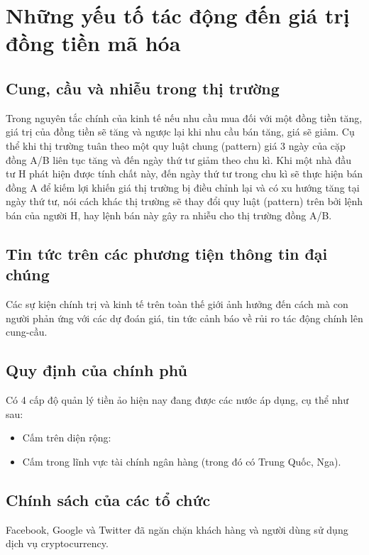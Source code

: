 \section{Những yếu tố tác động đến giá trị đồng tiền mã hóa} \label{overview:factor}
\subsection{Cung, cầu và nhiễu trong thị trường}\label{overview:market-noise}
Trong nguyên tắc chính của kinh tế nếu nhu cầu mua đối với một đồng tiền tăng, giá trị của đồng tiền sẽ tăng và ngược lại khi nhu cầu bán tăng, giá sẽ giảm. Cụ thể khi thị trường tuân theo một quy luật chung (pattern) giá 3 ngày của cặp đồng A/B liên tục tăng và đến ngày thứ tư giảm theo chu kì. Khi một nhà đầu tư H phát hiện được tính chất này, đến ngày thứ tư trong chu kì sẽ thực hiện bán đồng A để kiếm lợi khiến giá thị trường bị điều chỉnh lại và có xu hướng tăng tại ngày thứ tư, nói cách khác thị trường sẽ thay đổi quy luật (pattern) trên bởi lệnh bán của người H, hay lệnh bán này gây ra nhiễu cho thị trường đồng A/B.
\subsection{Tin tức trên các phương tiện thông tin đại chúng}
Các sự kiện chính trị và kinh tế trên toàn thế giới ảnh hưởng đến cách mà con người phản ứng với các dự đoán giá, tin tức cảnh báo về rủi ro tác động chính lên cung-cầu.
\subsection{Quy định của chính phủ}
Có 4 cấp độ quản lý tiền ảo hiện nay đang được các nước áp dụng, cụ thể như sau:
\begin{itemize}
	
	\item Cấm trên diện rộng:
	\item Cấm trong lĩnh vực tài chính ngân hàng (trong đó có Trung Quốc, Nga).
	
	
\end{itemize}
\subsection{Chính sách của các tổ chức}
Facebook, Google và Twitter đã ngăn chặn khách hàng và người dùng sử dụng dịch vụ cryptocurrency.
